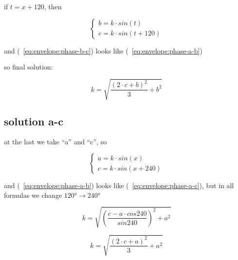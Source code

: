 \documentclass[unicode, 12pt, a4paper]{article}
\begin{document}
if $t = x + 120$, then

\begin{equation}
  \label{eq:envelope:phase-b-c}
  \begin{cases}
    b = k \cdot sin(t)\\
    c = k \cdot sin(t + 120)
  \end{cases}
\end{equation}

and (~\ref{eq:envelope:phase-b-c}) looks like (~\ref{eq:envelope:phase-a-b})

so final solution:

\begin{equation}
  k = \sqrt{\frac{(2 \cdot c + b)^2}{3} + b^2}
\end{equation}


\subsection{solution a-c}

at the last we take ``a'' and ``c'', so

\begin{equation}
  \label{eq:envelope:phase-a-c}
  \begin{cases}
    a = k \cdot sin(x)\\
    c = k \cdot sin(x + 240)
  \end{cases}
\end{equation}

and (~\ref{eq:envelope:phase-a-b}) looks like (~\ref{eq:envelope:phase-a-c}), but in all formulas we change $120° \rightarrow 240°$

\begin{equation}
  k = \sqrt{\left(\frac{c - a \cdot cos 240}{sin 240}\right)^2 + a^2}
\end{equation}

\begin{equation}
  k = \sqrt{\frac{(2 \cdot c + a)^2}{3} + a^2}
\end{equation}
\end{document}

